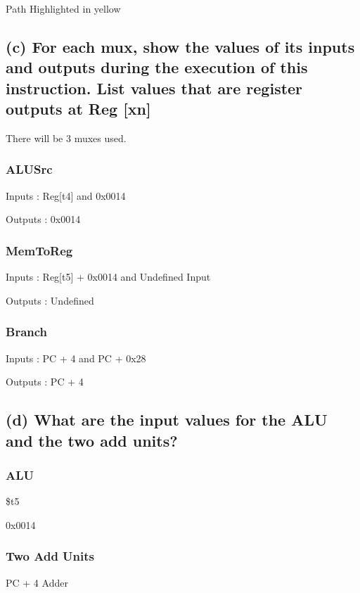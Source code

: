 \documentclass{article}
\begin{document}
    Path Highlighted in yellow

    \newpage

    \subsection*{(c) For each mux, show the values of its inputs and outputs during the execution of this instruction. List
    values that are register outputs at Reg [xn]}

    There will be 3 muxes used.

    \subsubsection*{ALUSrc}
    
    Inputs : Reg[t4] and 0x0014

    Outputs : 0x0014

    \subsubsection*{MemToReg}
    
    Inputs : Reg[t5] + 0x0014 and Undefined Input

    Outputs : Undefined

    \subsubsection*{Branch}
    
    Inputs :  PC + 4 and PC + 0x28

    Outputs : PC + 4

    \subsection*{(d) What are the input values for the ALU and the two
    add units?}

    \subsubsection*{ALU}

    \$t5

    0x0014

    \subsubsection*{Two Add Units}

    PC + 4 Adder 
\end{document}
